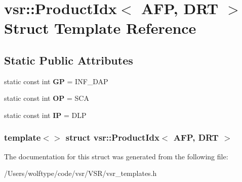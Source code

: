 \hypertarget{structvsr_1_1_product_idx_3_01_a_f_p_00_01_d_r_t_01_4}{\section{vsr\-:\-:Product\-Idx$<$ A\-F\-P, D\-R\-T $>$ Struct Template Reference}
\label{structvsr_1_1_product_idx_3_01_a_f_p_00_01_d_r_t_01_4}
}
\subsection*{Static Public Attributes}
\begin{DoxyCompactItemize}
\item 
\hypertarget{structvsr_1_1_product_idx_3_01_a_f_p_00_01_d_r_t_01_4_ab1f7dc9acba49724f5a93983da37393e}{static const int {\bfseries G\-P} = I\-N\-F\-\_\-\-D\-A\-P}\label{structvsr_1_1_product_idx_3_01_a_f_p_00_01_d_r_t_01_4_ab1f7dc9acba49724f5a93983da37393e}

\item 
\hypertarget{structvsr_1_1_product_idx_3_01_a_f_p_00_01_d_r_t_01_4_adcad80dd5d604c66f9ae1d634a8f1b3f}{static const int {\bfseries O\-P} = S\-C\-A}\label{structvsr_1_1_product_idx_3_01_a_f_p_00_01_d_r_t_01_4_adcad80dd5d604c66f9ae1d634a8f1b3f}

\item 
\hypertarget{structvsr_1_1_product_idx_3_01_a_f_p_00_01_d_r_t_01_4_a245d7c3c83aedacbaf9170207aa3391f}{static const int {\bfseries I\-P} = D\-L\-P}\label{structvsr_1_1_product_idx_3_01_a_f_p_00_01_d_r_t_01_4_a245d7c3c83aedacbaf9170207aa3391f}

\end{DoxyCompactItemize}
\subsubsection*{template$<$$>$ struct vsr\-::\-Product\-Idx$<$ A\-F\-P, D\-R\-T $>$}



The documentation for this struct was generated from the following file\-:\begin{DoxyCompactItemize}
\item 
/\-Users/wolftype/code/vsr/\-V\-S\-R/vsr\-\_\-templates.\-h\end{DoxyCompactItemize}
